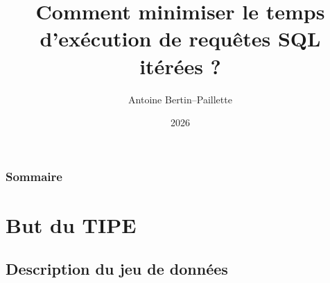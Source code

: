 \documentclass[a4paper,12pt]{beamer}
\title{Comment minimiser le temps d'exécution de requêtes SQL itérées ?}
\author[Eliott P. \& Antoine BP]{Antoine Bertin--Paillette}
\date{2026}
\begin{document}
\begin{frame}
    \titlepage
\end{frame}

\begin{frame}
    \frametitle{Sommaire}
    \tableofcontents[hideallsubsections]
\end{frame}

\section{But du TIPE}

\subsection{Description du jeu de données}
\end{document}
